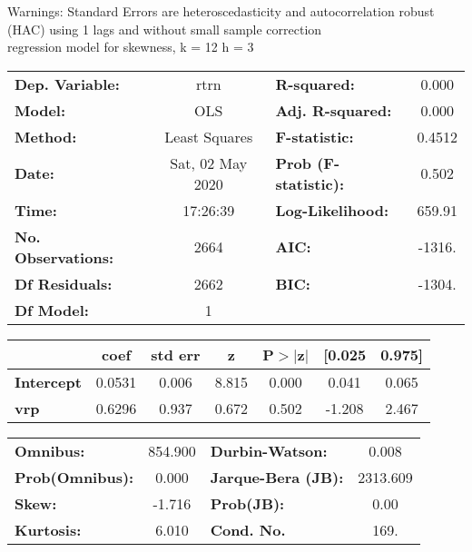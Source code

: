 Warnings: \newline
 [1] Standard Errors are heteroscedasticity and autocorrelation robust (HAC) using 1 lags and without small sample correction\\ 

regression model for skewness, k = 12 h = 3\begin{center}
\begin{tabular}{lclc}
\toprule
\textbf{Dep. Variable:}    &       rtrn       & \textbf{  R-squared:         } &     0.000   \\
\textbf{Model:}            &       OLS        & \textbf{  Adj. R-squared:    } &     0.000   \\
\textbf{Method:}           &  Least Squares   & \textbf{  F-statistic:       } &    0.4512   \\
\textbf{Date:}             & Sat, 02 May 2020 & \textbf{  Prob (F-statistic):} &    0.502    \\
\textbf{Time:}             &     17:26:39     & \textbf{  Log-Likelihood:    } &    659.91   \\
\textbf{No. Observations:} &        2664      & \textbf{  AIC:               } &    -1316.   \\
\textbf{Df Residuals:}     &        2662      & \textbf{  BIC:               } &    -1304.   \\
\textbf{Df Model:}         &           1      & \textbf{                     } &             \\
\bottomrule
\end{tabular}
\begin{tabular}{lcccccc}
                   & \textbf{coef} & \textbf{std err} & \textbf{z} & \textbf{P$> |$z$|$} & \textbf{[0.025} & \textbf{0.975]}  \\
\midrule
\textbf{Intercept} &       0.0531  &        0.006     &     8.815  &         0.000        &        0.041    &        0.065     \\
\textbf{vrp}       &       0.6296  &        0.937     &     0.672  &         0.502        &       -1.208    &        2.467     \\
\bottomrule
\end{tabular}
\begin{tabular}{lclc}
\textbf{Omnibus:}       & 854.900 & \textbf{  Durbin-Watson:     } &    0.008  \\
\textbf{Prob(Omnibus):} &   0.000 & \textbf{  Jarque-Bera (JB):  } & 2313.609  \\
\textbf{Skew:}          &  -1.716 & \textbf{  Prob(JB):          } &     0.00  \\
\textbf{Kurtosis:}      &   6.010 & \textbf{  Cond. No.          } &     169.  \\
\bottomrule
\end{tabular}
\end{center}

